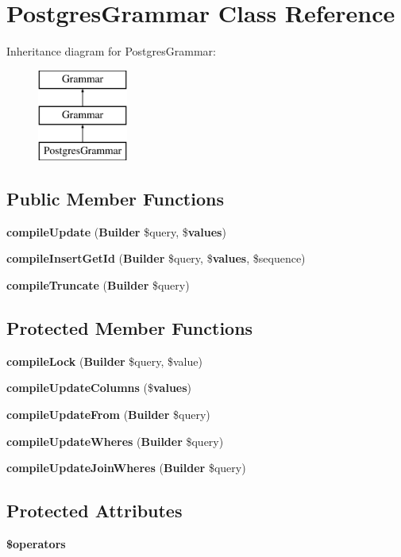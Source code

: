 \section{Postgres\+Grammar Class Reference}
\label{class_illuminate_1_1_database_1_1_query_1_1_grammars_1_1_postgres_grammar}
Inheritance diagram for Postgres\+Grammar\+:\begin{figure}[H]
\begin{center}
\leavevmode
\includegraphics[height=3.000000cm]{class_illuminate_1_1_database_1_1_query_1_1_grammars_1_1_postgres_grammar}
\end{center}
\end{figure}
\subsection*{Public Member Functions}
\begin{DoxyCompactItemize}
\item 
{\bf compile\+Update} ({\bf Builder} \$query, \${\bf values})
\item 
{\bf compile\+Insert\+Get\+Id} ({\bf Builder} \$query, \${\bf values}, \$sequence)
\item 
{\bf compile\+Truncate} ({\bf Builder} \$query)
\end{DoxyCompactItemize}
\subsection*{Protected Member Functions}
\begin{DoxyCompactItemize}
\item 
{\bf compile\+Lock} ({\bf Builder} \$query, \$value)
\item 
{\bf compile\+Update\+Columns} (\${\bf values})
\item 
{\bf compile\+Update\+From} ({\bf Builder} \$query)
\item 
{\bf compile\+Update\+Wheres} ({\bf Builder} \$query)
\item 
{\bf compile\+Update\+Join\+Wheres} ({\bf Builder} \$query)
\end{DoxyCompactItemize}
\subsection*{Protected Attributes}
\begin{DoxyCompactItemize}
\item 
{\bf \$operators}
\end{DoxyCompactItemize}


